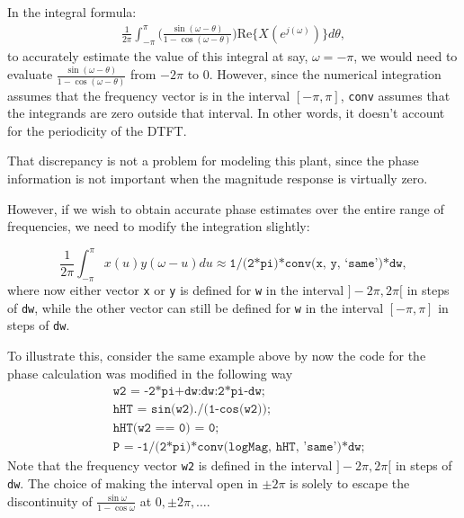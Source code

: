 \documentclass{article}
\begin{document}
In the integral formula:
\begin{align} \nonumber
\frac{1}{2\pi}\int_{-\pi}^{\pi}\bigg(\frac{\sin(\omega-\theta)}{1-\cos(\omega-\theta)}\bigg)\mathrm{Re}\{X(e^{j(\omega)})\}d\theta,
\end{align}
to accurately estimate the value of this integral at say, $\omega= -\pi$, we would need to evaluate $\frac{\sin(\omega-\theta)}{1-\cos(\omega-\theta)}$ from $-2\pi$ to $0$. However, since the numerical integration assumes that the frequency vector is in the interval $[-\pi, \pi]$, \texttt{conv} assumes that the integrands are zero outside that interval. In other words, it doesn't account for the periodicity of the DTFT.

That discrepancy is not a problem for modeling this plant, since the phase information is not important when the magnitude response is virtually zero.

However, if we wish to obtain accurate phase estimates over the entire range of frequencies, we need to modify the integration slightly:

\begin{equation}
\frac{1}{2\pi}\int_{-\pi}^{\pi}x(u)y(\omega-u)du \approx \texttt{1/(2*pi)*conv(x, y, `same')*dw},
\end{equation}
where now either vector \texttt{x} or \texttt{y} is defined for \texttt{w} in the interval $]-2\pi, 2\pi[$ in steps of \texttt{dw}, while the other vector can still be defined for \texttt{w} in the interval $[-\pi, \pi]$ in steps of \texttt{dw}. 

To illustrate this, consider the same example above by now the code for the phase calculation was modified in the following way
\begin{align*}
& \texttt{w2 = -2*pi+dw:dw:2*pi-dw;} \\
& \texttt{hHT = sin(w2)./(1-cos(w2));} \\
& \texttt{hHT(w2 == 0) = 0;}\\
& \texttt{P = -1/(2*pi)*conv(logMag, hHT, 'same')*dw;}
\end{align*}
Note that the frequency vector \texttt{w2} is defined in the interval $]-2\pi, 2\pi[$ in steps of \texttt{dw}. The choice of making the interval open in $\pm 2\pi$ is solely to escape the discontinuity of $\frac{\sin\omega}{1-\cos\omega}$ at $0, \pm2\pi, \ldots$.
\end{document}
